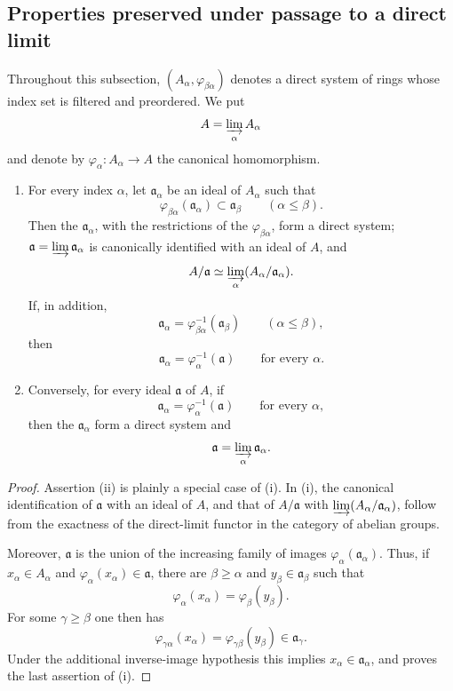 \subsection{Properties preserved under passage to a direct limit}
\label{subsection:IV.5.13}


Throughout this subsection,
$(A_\alpha,\varphi_{\beta\alpha})$ denotes a direct system of
rings whose index set is filtered and preordered.  We put
\[
  A=\varinjlim_\alpha A_\alpha
\]
and denote by $\varphi_\alpha:A_\alpha\to A$ the canonical
homomorphism.

\begin{proposition}[5.13.1]
\label{IV.5.13.1}
\begin{enumerate}[{\rm(i)}]
  \item For every index $\alpha$, let $\mathfrak a_\alpha$ be an
  ideal of $A_\alpha$ such that
  \[
    \varphi_{\beta\alpha}(\mathfrak a_\alpha)
    \subset\mathfrak a_\beta
    \qquad(\alpha\leq\beta).
  \]
  Then the $\mathfrak a_\alpha$, with the restrictions of the
  $\varphi_{\beta\alpha}$, form a direct system;
  $\mathfrak a=\varinjlim\mathfrak a_\alpha$ is canonically
  identified with an ideal of $A$, and
  \[
    A/\mathfrak a
    \simeq
    \varinjlim_\alpha(A_\alpha/\mathfrak a_\alpha).
  \]
  If, in addition,
  \[
    \mathfrak a_\alpha
    =\varphi_{\beta\alpha}^{-1}(\mathfrak a_\beta)
    \qquad(\alpha\leq\beta),
  \]
  then
  \[
    \mathfrak a_\alpha=\varphi_\alpha^{-1}(\mathfrak a)
    \qquad\text{for every }\alpha.
  \]

  \item Conversely, for every ideal $\mathfrak a$ of $A$, if
  \[
    \mathfrak a_\alpha=\varphi_\alpha^{-1}(\mathfrak a)
    \qquad\text{for every }\alpha,
  \]
  then the $\mathfrak a_\alpha$ form a direct system and
  \[
    \mathfrak a=\varinjlim_\alpha\mathfrak a_\alpha.
  \]
\end{enumerate}
\end{proposition}

\begin{proof}
Assertion {\rm(ii)} is plainly a special case of {\rm(i)}.
In {\rm(i)}, the canonical identification of
$\mathfrak a$ with an ideal of $A$, and that of
$A/\mathfrak a$ with
$\varinjlim(A_\alpha/\mathfrak a_\alpha)$, follow from the
exactness of the direct-limit functor in the category of abelian
groups.

Moreover, $\mathfrak a$ is the union of the increasing family of
images $\varphi_\alpha(\mathfrak a_\alpha)$.  Thus, if
$x_\alpha\in A_\alpha$ and
$\varphi_\alpha(x_\alpha)\in\mathfrak a$, there are
$\beta\geq\alpha$ and $y_\beta\in\mathfrak a_\beta$ such that
\[
  \varphi_\alpha(x_\alpha)=\varphi_\beta(y_\beta).
\]
For some $\gamma\geq\beta$ one then has
\[
  \varphi_{\gamma\alpha}(x_\alpha)
  =\varphi_{\gamma\beta}(y_\beta)\in\mathfrak a_\gamma.
\]
Under the additional inverse-image hypothesis this implies
$x_\alpha\in\mathfrak a_\alpha$, and proves the last assertion of
{\rm(i)}.
\end{proof}

